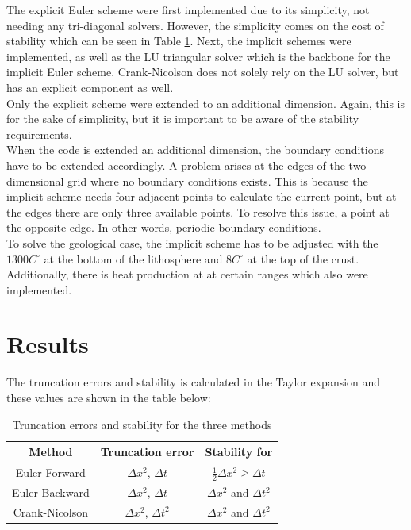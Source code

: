 \documentclass[10pt,a4paper]{article}
\begin{document}
\noindent The explicit Euler scheme were first implemented due to its simplicity, not needing any tri-diagonal solvers. However, the simplicity comes on the cost of stability which can be seen in Table \ref{truncstab}. Next, the implicit schemes were implemented, as well as the LU triangular solver which is the backbone for the implicit Euler scheme. Crank-Nicolson does not solely rely on the LU solver, but has an explicit component as well.\\

\noindent Only the explicit scheme were extended to an additional dimension. Again, this is for the sake of simplicity, but it is important to be aware of the stability requirements. \\

\noindent When the code is extended an additional dimension, the boundary conditions have to be extended accordingly. A problem arises at the edges of the two-dimensional grid where no boundary conditions exists. This is because the implicit scheme needs four adjacent points to calculate the current point, but at the edges there are only three available points. To resolve this issue, a point at the opposite edge. In other words, periodic boundary conditions. \\


\noindent To solve the geological case, the implicit scheme has to be adjusted with the $1300 C^{\circ}$ at the bottom of the lithosphere and $8 C^{\circ}$ at the top of the crust. Additionally, there is heat production at at certain ranges which also were implemented.



\newpage
\section*{Results}


\noindent The truncation errors and stability is calculated in the Taylor expansion and these values are shown in the table below:


\begin{table}[H]
\centering
\caption{Truncation errors and stability for the three methods}
\begin{tabular}{|c|c|c|}
\hline
Method & Truncation error & Stability for\\
\hline
Euler Forward & $\Delta x^2$, $\Delta t$ & $\frac{1}{2} \Delta x^2 \geq \Delta t$\\
\hline
Euler Backward & $\Delta x^2$, $\Delta t$ & $\Delta x^2$ and $\Delta t^2$\\
\hline
Crank-Nicolson & $\Delta x^2$, $\Delta t^2$ & $\Delta x^2$ and $\Delta t^2$\\
\hline
\end{tabular}
\label{truncstab}
\end{table}
 
\end{document}
